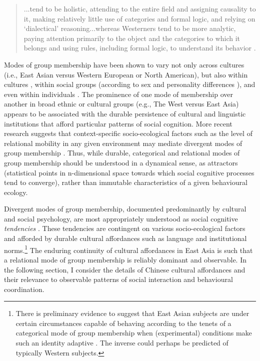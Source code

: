 \begin{CJK}{UTF8}{gbsn}
  \begin{quote}
    ...tend to be holistic, attending to the entire field and assigning causality to it, making relatively little use of categories and formal logic, and relying on `dialectical' reasoning...whereas Westerners tend to be more analytic, paying attention primarily to the object and the categories to which it belongs and using rules, including formal logic, to understand its behavior \citep[291]{Nisbett2001}.
  \end{quote}

Modes of group membership have been shown to vary not only across cultures (i.e., East Asian versus Western European or North American), but also within cultures \citep{Henrich2014}, within social groups (according to sex and personality differences \citep{Yuki2014}), and even within individuals \citep[depending on contextual and situational primes, see][]{Lee2014,Wong2005}.  The prominence of one mode of membership over another in broad ethnic or cultural groups (e.g., The West versus East Asia) appears to be associated with the durable persistence of cultural and linguistic institutions that afford particular patterns of social cognition.  More recent research suggests that context-specific socio-ecological factors such as the level of relational mobility in any given environment may mediate divergent modes of group membership \citep{Oishi2010,Takagishi2014,Yuki2005}.  Thus, while durable, categorical and relational modes of group membership should be understood in a dynamical sense, as attractors (statistical points in n-dimensional space towards which social cognitive processes tend to converge), rather than immutable characteristics of a given behavioural ecology.

Divergent modes of group membership, documented predominantly by cultural and social psychology, are most appropriately understood as social cognitive \textit{tendencies} \citep{Nisbett2003}.  These tendencies are contingent on various socio-ecological factors and afforded by durable cultural affordances such as language and institutional norms.\footnote{There is preliminary evidence to suggest that East Asian subjects are under certain circumstances capable of behaving according to the tenets of a categorical mode of group membership when (experimental) conditions make such an identity adaptive \citep{Hong2000}. The inverse could perhaps be predicted of typically Western subjects.}  The enduring continuity of cultural affordances in East Asia is such that a relational mode of group membership is reliably dominant and observable.  In the following section, I consider the details of Chinese cultural affordances and their relevance to observable patterns of social interaction and behavioural coordination.


\end{CJK}
